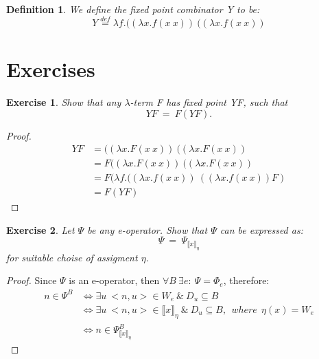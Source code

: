 \documentclass{article}
\newtheorem{definition}{Definition}[section] %
\newtheorem{exercise}{Exercise}[section]
\begin{document}
	\begin{definition}
		We define the fixed point combinator Y to be:
		\begin{equation}
			Y \stackrel{def}{=} \lambda f.
				((\lambda x. f(x\:x))\:
				((\lambda x. f(x\:x))
		\end{equation}
	\end{definition}

	\section{Exercises}
	\begin{exercise}
		Show that any $\lambda$-term F has fixed point YF, such that
			\begin{equation}
				YF\:=\:F(YF).
			\end{equation}
	\end{exercise}
	\begin{proof}
		\begin{equation*}
     \begin{split}
			YF &= ((\lambda x. F(x\:x))\:((\lambda x. F(x\:x))\\
				&= F((\lambda x. F(x\:x))\:((\lambda x. F(x\:x))\\
				&= F(\lambda f. 
						((\lambda x. f(x\:x))\:
						((\lambda x. f(x\:x)) F)\\
				&= F(YF)
     \end{split}
		\end{equation*}
	\end{proof}

	\begin{exercise}
		Let $\Psi$ be any e-operator. Show that $\Psi$ can be
		expressed as:
			\begin{equation}
				\Psi\:=\:\Psi_{\llbracket x \rrbracket_{\eta}}
			\end{equation}
		for suitable choise of assigment $\eta$.
	\end{exercise}
	\begin{proof}
		Since $\Psi$ is an e-operator, then 
		$\forall B \: \exists e:\: \Psi = \Phi_e$, therefore:
		\begin{equation*}
		\begin{split}
			n \in \Psi^B &\iff \exists u \: 
				<n, u> \in W_e \:\&\: D_u \subseteq B\\
			&\iff \exists u \: <n, u> \in 
				\llbracket x \rrbracket_{\eta} \:\&\: D_u \subseteq B
				,\:\: where \:\:\eta(x) = W_e\\
			&\iff n \in \Psi_{\llbracket x \rrbracket_{\eta}}^B
		\end{split}
		\end{equation*}
	\end{proof}
\end{document}
